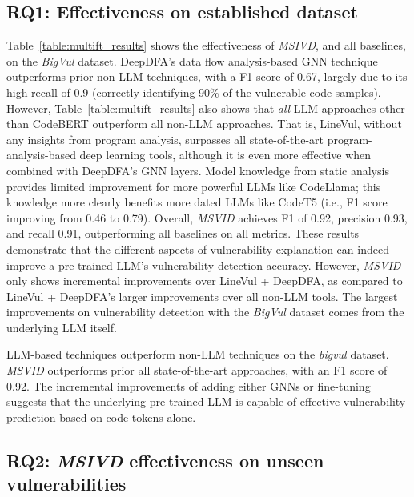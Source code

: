 \documentclass[12pt,openany,oneside,table]{cmuthesis}
\begin{document}
\subsection{RQ1: Effectiveness on established dataset}
\label{sec:rq1}
Table~\ref{table:multift_results} shows the effectiveness of \textit{MSIVD}, and all baselines, on the \textit{BigVul} dataset. 
DeepDFA's data flow analysis-based GNN technique outperforms prior non-LLM techniques, with a F1 score of 0.67, largely due to its high recall of 0.9  (correctly identifying 90\% of the vulnerable code samples).
However, Table~\ref{table:multift_results} also shows that \emph{all} LLM approaches other than CodeBERT outperform all non-LLM approaches. That is, LineVul, without any insights from program analysis, surpasses all state-of-the-art program-analysis-based deep learning tools, although it is even more effective when combined with DeepDFA's GNN layers. 
Model knowledge from static analysis provides limited improvement for more powerful LLMs like CodeLlama; this knowledge more clearly benefits more dated LLMs like CodeT5 (i.e., F1 score improving from 0.46 to 0.79). 
Overall, \textit{MSVID} achieves F1 of 0.92, precision 0.93, and recall 0.91, outperforming all baselines on all metrics. These results demonstrate that the different aspects of vulnerability explanation can indeed improve a pre-trained LLM's vulnerability detection accuracy. However, \textit{MSVID} only shows incremental improvements over LineVul + DeepDFA, as compared to LineVul + DeepDFA's larger improvements over all non-LLM tools. The largest improvements on vulnerability detection with the \textit{BigVul} dataset comes from the underlying LLM itself. 

\begin{tcolorbox}
[colback=white,colframe=black,arc=0pt,boxrule=0.5pt,title=RQ1 Summary,boxsep=2pt,left=1pt,right=1pt,top=1pt,bottom=1pt,fonttitle=\bfseries] 
LLM-based techniques outperform non-LLM techniques on the \textit{bigvul} dataset. \textit{MSVID} outperforms prior all state-of-the-art approaches, with an F1 score of 0.92. The incremental improvements of adding either GNNs or fine-tuning suggests that the underlying pre-trained LLM is capable of effective vulnerability prediction based on code tokens alone.
\end{tcolorbox}

\subsection{RQ2: \textit{MSIVD} effectiveness on unseen vulnerabilities} 
\label{sec:rq2}
\end{document}

